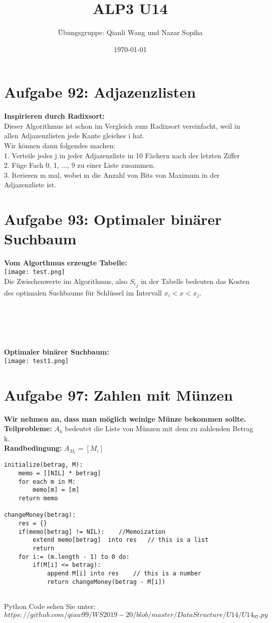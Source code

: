 \documentclass{article}
\title{ALP3 U14}
\author{Übungsgruppe: Qianli Wang und Nazar Sopiha}
\date{\today}
\begin{document}
\maketitle

\section{Aufgabe 92: Adjazenzlisten}
\textbf{Inspirieren durch Radixsort:}\\
Dieser Algorithmus ist schon im Vergleich zum Radixsort vereinfacht, weil in allen Adjazenzlisten jede Kante gleiches i hat.\\
Wir können dann folgendes machen:\\
1. Verteile jedes j in jeder Adjazenzliste in 10 Fächern nach der letzten Ziffer  \\
2. Füge Fach 0, 1, ..., 9 zu einer Liste zusammen.\\
3. Iterieren m mal, wobei m die Anzahl von Bits von Maximum in der Adjazenzliste ist.

\section{Aufgabe 93: Optimaler binärer Suchbaum}
\textbf{Vom Algorthmus erzeugte Tabelle:}\\
\texttt{[image: test.png]}\\
Die Zwischenwerte im Algorithmus, also ${S_i}_j$ in der Tabelle bedeuten das Kosten des optimalen Suchbaums für Schlüssel im Intervall $x_i < x < x_j$. 
\\
\\
\\
\\
\\
\\
\textbf{Optimaler binärer Suchbaum:}\\
\texttt{[image: test1.png]}\\




\section{Aufgabe 97: Zahlen mit Münzen}
\textbf{Wir nehmen an, dass man möglich weinige Münze bekommen sollte.} \\ 
\textbf{Teilprobleme:} $A_k$ bedeutet die Liste von Münzen mit dem zu zahlenden Betrag k. \\
\textbf{Randbedingung:} $A_{M_i} = [M_i]$\\
\begin{lstlisting}
initialize(betrag, M):	
	memo = [[NIL] * betrag]
	for each m in M:
		memo[m] = [m]
	return memo
	
changeMoney(betrag):
	res = {}
	if(memo[betrag] != NIL):	//Memoization
		extend memo[betrag]	 into res	// this is a list
		return 
	for i:= (m.length - 1) to 0 do:
		if(M[i] <= betrag):
			append M[i] into res	// this is a number
			return changeMoney(betrag - M[i])
	
\end{lstlisting}
Python Code sehen Sie unter: $https://github.com/qiaw99/WS2019-20/blob/master/DataStructure/U14/U14_97.py$
\end{document}
